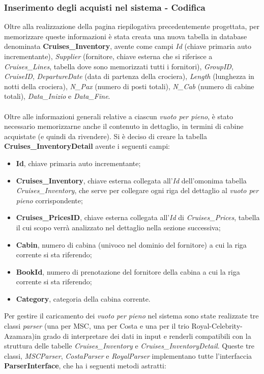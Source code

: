 \subsubsection{Inserimento degli acquisti nel sistema - Codifica}
Oltre alla realizzazione della pagina riepilogativa precedentemente progettata, per memorizzare queste informazioni è stata creata una nuova tabella in database denominata \textbf{Cruises\_Inventory}, avente come campi \textit{Id} (chiave primaria auto incrementante), \textit{Supplier} (fornitore, chiave esterna che si riferisce a \textit{Cruises\_Lines}, tabella dove sono memorizzati tutti i fornitori), \textit{GroupID}, \textit{CruiseID}, \textit{DepartureDate} (data di partenza della crociera), \textit{Length} (lunghezza in notti della crociera), \textit{N\_Pax} (numero di posti totali), \textit{N\_Cab} (numero di cabine totali), \textit{Data\_Inizio} e \textit{Data\_Fine}.\\
\\
Oltre alle informazioni generali relative a ciascun \textit{vuoto per pieno}, è stato necessario memorizzarne anche il contenuto in dettaglio, in termini di cabine acquistate (e quindi da rivendere). Si è deciso di creare la tabella \textbf{Cruises\_InventoryDetail} avente i seguenti campi:
\begin{itemize}
	\item \textbf{Id}, chiave primaria auto incrementante;
	\item \textbf{Cruises\_Inventory}, chiave esterna collegata all'\textit{Id} dell'omonima tabella \textit{Cruises\_Inventory}, che serve per collegare ogni riga del dettaglio al \textit{vuoto per pieno} corrispondente;
	\item \textbf{Cruises\_PricesID}, chiave esterna collegata all'\textit{Id} di \textit{Cruises\_Prices}, tabella il cui scopo verrà analizzato nel dettaglio nella sezione successiva;
	\item \textbf{Cabin}, numero di cabina (univoco nel dominio del fornitore) a cui la riga corrente si sta riferendo;
	\item \textbf{BookId}, numero di prenotazione del fornitore della cabina a cui la riga corrente si sta riferendo;
	\item \textbf{Category}, categoria della cabina corrente.
\end{itemize}
Per gestire il caricamento dei \textit{vuoto per pieno} nel sistema sono state realizzate tre classi \textit{parser} (una per MSC, una per Costa e una per il trio Royal-Celebrity-Azamara)in grado di interpretare dei dati in input e renderli compatibili con la struttura delle tabelle \textit{Cruises\_Inventory} e \textit{Cruises\_InventoryDetail}. Queste tre classi, \textit{MSCParser}, \textit{CostaParser} e \textit{RoyalParser} implementano tutte l'interfaccia \textbf{ParserInterface}, che ha i seguenti metodi astratti:
